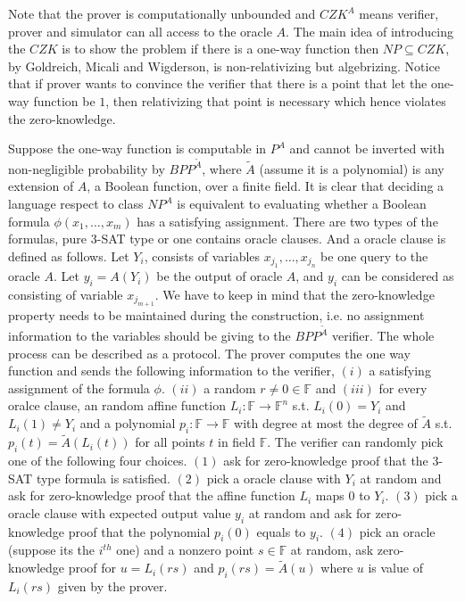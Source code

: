 \documentclass{article}
\begin{document}
Note that the prover is computationally unbounded and $CZK^A$ means verifier, prover and simulator can all access to the oracle $A$. The main idea of introducing the $CZK$ is to show the problem if there is a one-way function then $NP \subseteq CZK$, by Goldreich, Micali and Wigderson\cite{goldreich1991proofs}, is non-relativizing but algebrizing. Notice that if prover wants to convince the verifier that there is a point that let the one-way function be $1$, then relativizing that point is necessary which hence violates the zero-knowledge. 

Suppose the one-way function is computable in $P^A$ and cannot be inverted with non-negligible probability by $BPP^{\tilde{A}}$, where $\tilde{A}$ (assume it is a polynomial) is any extension of $A$, a Boolean function, over a finite field. It is clear that deciding a language respect to class $NP^A$ is equivalent to evaluating whether a Boolean formula $\phi(x_1,\dots,x_m)$ has a satisfying assignment. There are two types of the formulas, pure 3-SAT type or one contains oracle clauses. And a oracle clause is defined as follows. Let $Y_i $, consists of variables $ x_{j_1},\dots,x_{j_n}$ be one query to the oracle $A$. Let $y_i = A(Y_i)$ be the output of oracle $A$, and $y_i$ can be considered as consisting of variable $x_{j_{m+1}}$. We have to keep in mind that the zero-knowledge property needs to be maintained during the construction, i.e. no assignment information to the variables should be giving to the $BPP^{\tilde{A}}$ verifier. The whole process can be described as a protocol. The prover computes the one way function and sends the following information to the verifier, $(i)$ a satisfying assignment of the formula $\phi$. $(ii)$ a random $r \neq 0 \in \mathbb{F}$ and $(iii)$ for every oralce clause, an random affine function $L_i: \mathbb{F} \rightarrow \mathbb{F}^n$ s.t. $L_i(0) = Y_i$ and  $L_i(1) \neq Y_i$ and a polynomial $p_i: \mathbb{F} \rightarrow \mathbb{F}$ with degree at most the degree of $\tilde{A}$ s.t. $p_i(t) = \tilde{A}(L_i(t))$ for all points $t$ in field $\mathbb{F}$. The verifier can randomly pick one of the following four choices. $(1)$ ask for zero-knowledge proof that the 3-SAT type formula is satisfied. $(2)$ pick a oracle clause with $Y_i$ at random and ask for zero-knowledge proof that the affine function $L_i$ maps $0$ to $Y_i$. $(3)$ pick a oracle clause with expected output value $y_i$ at random and ask for zero-knowledge proof that the polynomial $p_i(0)$ equals to $y_i$. $(4)$ pick an oracle (suppose its the $i^{th}$ one) and a nonzero point $s\in \mathbb{F}$ at random, ask zero-knowledge proof for $u = L_i(rs)$ and $p_i(rs) = \tilde{A}(u)$ where $u$ is value of $L_i(rs)$ given by the prover.
\end{document}
